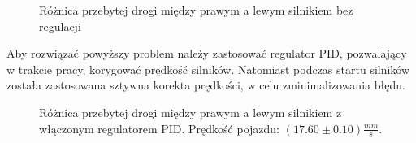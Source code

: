             \begin{figure}[!ht]
                \centering
                \renewcommand{\figurename}{Wykres}
                \caption{Różnica przebytej drogi między prawym a lewym silnikiem bez regulacji}
                \label{plot:distance_err_in_time_const_speed}
            \end{figure}

            Aby rozwiązać powyższy problem należy zastosować regulator PID, pozwalający w trakcie pracy, korygować prędkość silników.
            Natomiast podczas startu silników została zastosowana sztywna korekta prędkości, w celu zminimalizowania błędu.
            \begin{figure}[!ht]
                \centering
                \renewcommand{\figurename}{Wykres}
                \caption{Różnica przebytej drogi między prawym a lewym silnikiem z włączonym regulatorem PID. Prędkość pojazdu: $(17.60 \pm 0.10)\frac{mm}{s}$.}
                \label{plot:PID_distance_err_in_time}
            \end{figure}

